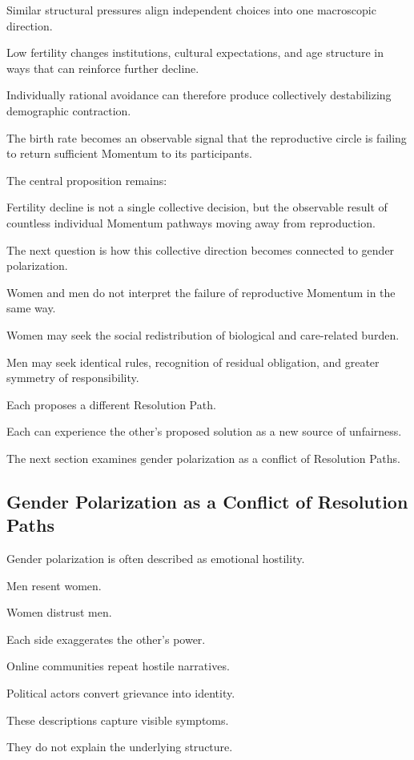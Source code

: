 Similar structural pressures align independent choices into one macroscopic direction.

Low fertility changes institutions, cultural expectations, and age structure in ways that can reinforce further decline.

Individually rational avoidance can therefore produce collectively destabilizing demographic contraction.

The birth rate becomes an observable signal that the reproductive circle is failing to return sufficient Momentum to its participants.

The central proposition remains:

Fertility decline is not a single collective decision, but the observable result of countless individual Momentum pathways moving away from reproduction.

The next question is how this collective direction becomes connected to gender polarization.

Women and men do not interpret the failure of reproductive Momentum in the same way.

Women may seek the social redistribution of biological and care-related burden.

Men may seek identical rules, recognition of residual obligation, and greater symmetry of responsibility.

Each proposes a different Resolution Path.

Each can experience the other’s proposed solution as a new source of unfairness.

The next section examines gender polarization as a conflict of Resolution Paths.

\subsection*{\textbf{Gender Polarization as a Conflict of Resolution Paths}} 


Gender polarization is often described as emotional hostility.

Men resent women.

Women distrust men.

Each side exaggerates the other’s power.

Online communities repeat hostile narratives.

Political actors convert grievance into identity.

These descriptions capture visible symptoms.

They do not explain the underlying structure.

